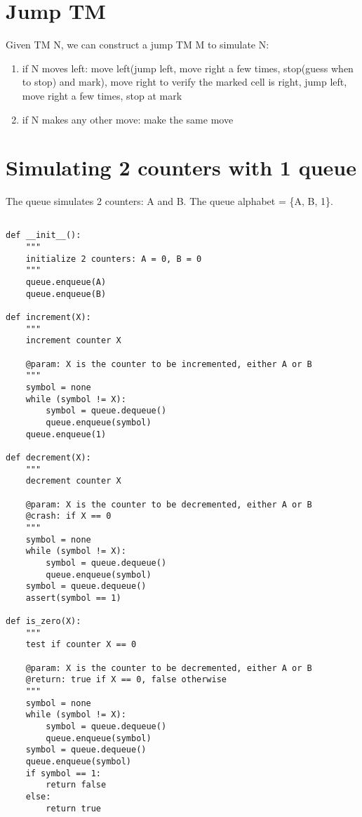 \documentclass{article}
\begin{document}
\section{Jump TM}

Given TM N, we can construct a jump TM M to simulate N:
\begin{enumerate}
	\item if N moves left: move left(jump left, move right a few times, stop(guess when to stop) and mark), move right to verify the marked cell is right, jump left, move right a few times, stop at mark
	\item if N makes any other move: make the same move
\end{enumerate}

\section{Simulating 2 counters with 1 queue}
The queue simulates 2 counters: A and B. The queue alphabet = \{A, B, 1\}.
\begin{lstlisting}

def __init__():
	"""
	initialize 2 counters: A = 0, B = 0
	"""
	queue.enqueue(A)
	queue.enqueue(B)
	
def increment(X):
	"""
	increment counter X
	
	@param: X is the counter to be incremented, either A or B
	"""
	symbol = none
	while (symbol != X):
		symbol = queue.dequeue()
		queue.enqueue(symbol)
	queue.enqueue(1)

def decrement(X):
	"""
	decrement counter X
	
	@param: X is the counter to be decremented, either A or B
	@crash: if X == 0
	"""
	symbol = none
	while (symbol != X):
		symbol = queue.dequeue()
		queue.enqueue(symbol)
	symbol = queue.dequeue()
	assert(symbol == 1)
	
def is_zero(X):
	"""
	test if counter X == 0
	
	@param: X is the counter to be decremented, either A or B
	@return: true if X == 0, false otherwise
	"""
	symbol = none
	while (symbol != X):
		symbol = queue.dequeue()
		queue.enqueue(symbol)
	symbol = queue.dequeue()	
	queue.enqueue(symbol)
	if symbol == 1:
		return false
	else:
		return true
	
\end{lstlisting}
\end{document}
